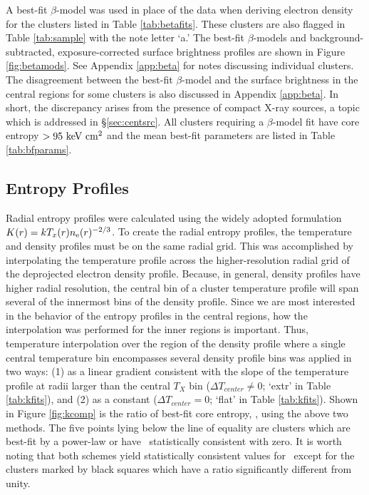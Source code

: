 \documentclass[12pt,preprint]{aastex}
\begin{document}
A best-fit $\beta$-model was used in place of the data when deriving
electron density for the clusters listed in Table
\ref{tab:betafits}. These clusters are also flagged in Table
\ref{tab:sample} with the note letter `a.' The best-fit $\beta$-models
and background-subtracted, exposure-corrected surface brightness
profiles are shown in Figure \ref{fig:betamods}. See Appendix
\ref{app:beta} for notes discussing individual clusters. The
disagreement between the best-fit $\beta$-model and the surface
brightness in the central regions for some clusters is also discussed
in Appendix \ref{app:beta}. In short, the discrepancy arises from the
presence of compact X-ray sources, a topic which is addressed in
\S\ref{sec:centsrc}. All clusters requiring a $\beta$-model fit have
core entropy $> 95 \mathrm{\mbox{\ensuremath{\mathrm{~keV}}} \mathrm{\mbox{\ensuremath{\mathrm{~cm}}}^2}}$ and the mean best-fit parameters are listed
in Table \ref{tab:bfparams}.

\subsection{Entropy Profiles}
\label{sec:kpr}

Radial entropy profiles were calculated using the widely adopted
formulation $K(r) = kT_x(r)n_{\mathrm{e}}(r)^{-2/3}$. To create the radial
entropy profiles, the temperature and density profiles must be on the
same radial grid. This was accomplished by interpolating the
temperature profile across the higher-resolution radial grid of the
deprojected electron density profile. Because, in general, density
profiles have higher radial resolution, the central bin of a cluster
temperature profile will span several of the innermost bins of the
density profile. Since we are most interested in the behavior of the
entropy profiles in the central regions, how the interpolation was
performed for the inner regions is important. Thus, temperature
interpolation over the region of the density profile where a single
central temperature bin encompasses several density profile bins was
applied in two ways: (1) as a linear gradient consistent with the
slope of the temperature profile at radii larger than the central
$T_X$ bin ($\Delta T_{center} \ne 0$; `extr' in Table
\ref{tab:kfits}), and (2) as a constant ($\Delta T_{center}=0$; `flat'
in Table \ref{tab:kfits}). Shown in Figure \ref{fig:kcomp} is the
ratio of best-fit core entropy, \kna, using the above two methods. The
five points lying below the line of equality are clusters which are
best-fit by a power-law or have \kna\ statistically consistent with
zero. It is worth noting that both schemes yield statistically
consistent values for \kna\ except for the clusters marked by black
squares which have a ratio significantly different from unity.
\end{document}
